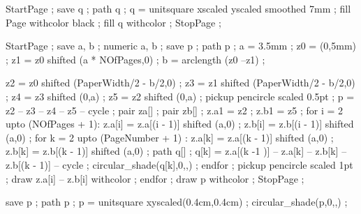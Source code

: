StartPage ;
save q ; path q ;
q = unitsquare xscaled \overlaywidth yscaled \overlayheight smoothed 7mm ;
fill Page withcolor black ;
fill q withcolor  ;
StopPage ;
\stopuniqueMPgraphic 

StartPage ;
save a, b ; numeric a, b ;
save p ; path p ;
a = 3.5mm ;
z0 = (0,5mm) ;
z1 = z0 shifted (a * NOfPages,0) ;
b = arclength (z0 --z1) ;

z2 = z0 shifted (PaperWidth/2 - b/2,0) ;
z3 = z1 shifted (PaperWidth/2 - b/2,0) ;
z4 = z3 shifted (0,a) ;
z5 = z2 shifted (0,a) ;
pickup pencircle scaled 0.5pt ;
p = z2 -- z3 -- z4 -- z5 -- cycle ;
pair za[] ;
pair zb[] ;
z.a1 = z2 ;
z.b1 = z5 ;
for i = 2 upto (NOfPages + 1):
  z.a[i] = z.a[(i - 1)] shifted (a,0) ;
  z.b[i] = z.b[(i - 1)] shifted (a,0) ;
  for k = 2 upto (PageNumber + 1) :
    z.a[k] = z.a[(k - 1)] shifted (a,0) ;
    z.b[k] = z.b[(k - 1)] shifted (a,0) ;
    path q[] ;
    q[k] = z.a[(k -1 )] -- z.a[k] -- z.b[k] -- z.b[(k - 1)] -- cycle ;
    circular_shade(q[k],0,,) ;
  endfor ;
  pickup pencircle scaled 1pt ;
  draw z.a[i] -- z.b[i] withcolor  ;
endfor ;
draw p withcolor  ;
StopPage ;
\stopuseMPgraphic

save p ; path p ;
p = unitsquare xyscaled(0.4cm,0.4cm) ;
circular_shade(p,0,,) ;
\stopuniqueMPgraphic








